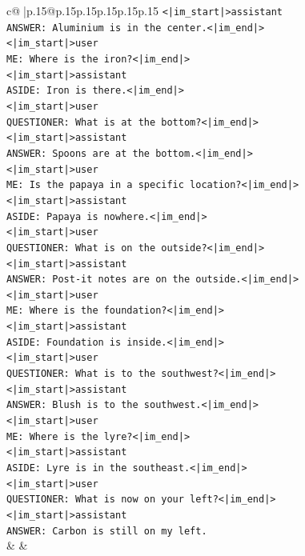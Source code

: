 \documentclass{article}
\begin{document}
{\begin{supertabular}{c@{$\;$}|p{.15\linewidth}@{}p{.15\linewidth}p{.15\linewidth}p{.15\linewidth}p{.15\linewidth}p{.15\linewidth}}
{{{\texttt{<|im\_start|>assistant} \\
\texttt{ANSWER: Aluminium is in the center.<|im\_end|>} \\
\texttt{<|im\_start|>user} \\
\texttt{ME: Where is the iron?<|im\_end|>} \\
\texttt{<|im\_start|>assistant} \\
\texttt{ASIDE: Iron is there.<|im\_end|>} \\
\texttt{<|im\_start|>user} \\
\texttt{QUESTIONER: What is at the bottom?<|im\_end|>} \\
\texttt{<|im\_start|>assistant} \\
\texttt{ANSWER: Spoons are at the bottom.<|im\_end|>} \\
\texttt{<|im\_start|>user} \\
\texttt{ME: Is the papaya in a specific location?<|im\_end|>} \\
\texttt{<|im\_start|>assistant} \\
\texttt{ASIDE: Papaya is nowhere.<|im\_end|>} \\
\texttt{<|im\_start|>user} \\
\texttt{QUESTIONER: What is on the outside?<|im\_end|>} \\
\texttt{<|im\_start|>assistant} \\
\texttt{ANSWER: Post{-}it notes are on the outside.<|im\_end|>} \\
\texttt{<|im\_start|>user} \\
\texttt{ME: Where is the foundation?<|im\_end|>} \\
\texttt{<|im\_start|>assistant} \\
\texttt{ASIDE: Foundation is inside.<|im\_end|>} \\
\texttt{<|im\_start|>user} \\
\texttt{QUESTIONER: What is to the southwest?<|im\_end|>} \\
\texttt{<|im\_start|>assistant} \\
\texttt{ANSWER: Blush is to the southwest.<|im\_end|>} \\
\texttt{<|im\_start|>user} \\
\texttt{ME: Where is the lyre?<|im\_end|>} \\
\texttt{<|im\_start|>assistant} \\
\texttt{ASIDE: Lyre is in the southeast.<|im\_end|>} \\
\texttt{<|im\_start|>user} \\
\texttt{QUESTIONER: What is now on your left?<|im\_end|>} \\
\texttt{<|im\_start|>assistant} \\
\texttt{ANSWER: Carbon is still on my left.} \\
            }
        }
    }
    & & \\ \\


\end{supertabular}}
\end{document}
